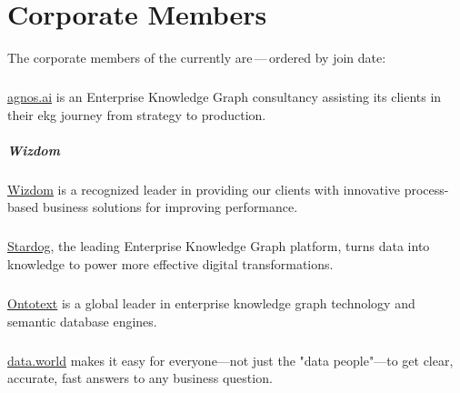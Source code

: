 \chapter{Corporate Members}
\label{appendix:ekgf-corporate-members}

The corporate members of the  currently are\,---\,ordered by join date:

\paragraph{\agnos}
\label{agnos}

\href{https://agnos.ai}{agnos.ai} is an Enterprise Knowledge Graph consultancy assisting its clients in
their \gls{ekg} journey from strategy to production.

\paragraph{Wizdom}
\label{wizdom}

\href{http://www.wizdom.com/}{Wizdom} is a recognized leader in providing our clients with
innovative process-based business solutions for improving performance.

\paragraph{\stardogcompany}
\label{stardog}

\href{https://www.stardog.com/}{Stardog}, the leading Enterprise Knowledge Graph platform,
turns data into knowledge to power more effective digital transformations.

\paragraph{\ontotext}
\label{ontotext}
\label{ontotext}
\label{ontotext!GraphDB}

\href{https://www.ontotext.com/}{Ontotext} is a global leader in enterprise knowledge graph technology
and semantic database engines.

\paragraph{\dataworld}
\label{dataworld}

\href{https://data.world}{data.world} makes it easy for everyone—not just the "data people"—to get clear, accurate,
fast answers to any business question.

